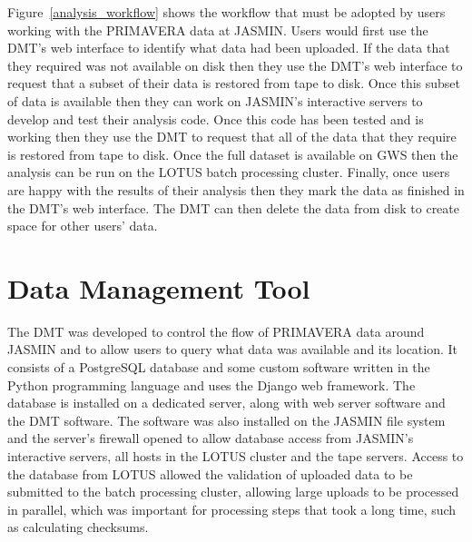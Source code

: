 \documentclass[gmd, manuscript]{copernicus}
\begin{document}
Figure~\ref{analysis_workflow} shows the workflow that must be adopted by users working with the PRIMAVERA data at JASMIN. Users would first use the DMT's web interface to identify what data had been uploaded. If the data that they required was not available on disk then they use the DMT's web interface to request that a subset of their data is restored from tape to disk. Once this subset of data is available then they can work on JASMIN's interactive servers to develop and test their analysis code. Once this code has been tested and is working then they use the DMT to request that all of the data that they require is restored from tape to disk. Once the full dataset is available on GWS then the analysis can be run on the LOTUS batch processing cluster. Finally, once users are happy with the results of their analysis then they mark the data as finished in the DMT's web interface. The DMT can then delete the data from disk to create space for other users' data.


\section{Data Management Tool}

The DMT was developed to control the flow of PRIMAVERA data around JASMIN and to allow users to query what data was available and its location. It consists of a PostgreSQL database and some custom software written in the Python programming language and uses the Django web framework. The database is installed on a dedicated server, along with web server software and the DMT software. The software was also installed on the JASMIN file system and the server's firewall opened to allow database access from JASMIN's interactive servers, all hosts in the LOTUS cluster and the tape servers. Access to the database from LOTUS allowed the validation of uploaded data to be submitted to the batch processing cluster, allowing large uploads to be processed in parallel, which was important for processing steps that took a long time, such as calculating checksums.
\end{document}
